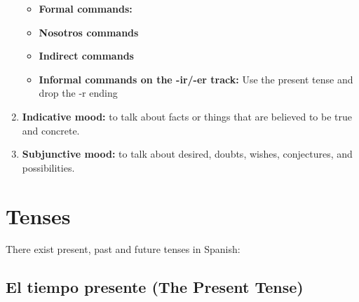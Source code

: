 \documentclass[a4paper,12pt]{article}
\begin{document}
\begin{enumerate}
\begin{itemize}
  \item \textbf{Formal commands:}
  \item \textbf{Nosotros commands}
  \item \textbf{Indirect commands}


\item \textbf{Informal commands on the -ir/-er track:} Use the present tense and drop the -r ending


  \end{itemize}


\item \textbf{Indicative mood:} to talk about facts or things that are believed to be true and
  concrete.
\item \textbf{Subjunctive mood:} to talk about desired, doubts, wishes, conjectures, and
  possibilities.

\end{enumerate}


\section{Tenses}

There exist present, past and future tenses in Spanish:

\subsection{El tiempo presente (The Present Tense)}
\end{document}
